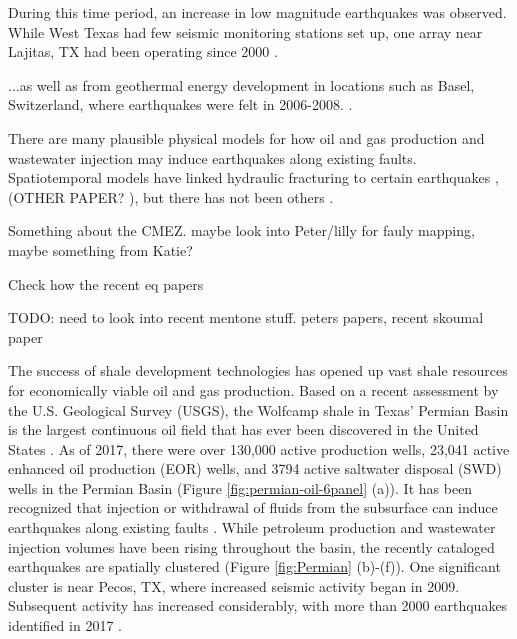 \documentclass{utexasthesis}
\begin{document}
During this time period, an increase in low magnitude earthquakes was observed. While West Texas had few seismic monitoring stations set up, one array near Lajitas, TX had been operating since 2000 \cite{Frohlich2019OnsetCauseIncreased}.


...as well as from geothermal energy development in locations such as Basel, Switzerland, where earthquakes were felt in 2006-2008. \cite{Deichmann2009EarthquakesInducedStimulation}.


There are many plausible physical models for how oil and gas production and wastewater injection may induce earthquakes along existing faults.
Spatiotemporal models have linked hydraulic fracturing to certain earthquakes \citep{Savvaidis2020InducedSeismicityDelaware}, (OTHER PAPER? ), but there has not been others .


Something about the CMEZ. maybe look into Peter/lilly for fauly mapping, maybe something from Katie?

Check how the recent eq papers 

TODO: need to look into recent mentone stuff. peters papers, recent skoumal paper



The success of shale development technologies \citep{Waters2006Spe103202Ms} has opened up vast shale resources for economically viable oil and gas production. Based on a recent assessment by the U.S. Geological Survey (USGS), the Wolfcamp shale in Texas' Permian Basin is the largest continuous oil field that has ever been discovered in the United States \citep{GaswirthAssessment2016} . As of 2017, there were over 130,000 active production wells, 23,041 active enhanced oil production (EOR) wells, and 3794 active saltwater disposal (SWD) wells in the Permian Basin (Figure \ref{fig:permian-oil-6panel} (a)). It has been recognized that injection or withdrawal of fluids from the subsurface can induce earthquakes along existing faults \citep{Ellsworth2013, simpson1988two}. While petroleum production and wastewater injection volumes have been rising throughout the basin, the recently cataloged earthquakes are spatially clustered (Figure \ref{fig:Permian} (b)-(f)). One significant cluster is near Pecos, TX, where increased seismic activity began in 2009. Subsequent activity has increased considerably, with more than 2000 earthquakes identified in 2017 \citep{Frohlich2019}.
\end{document}
